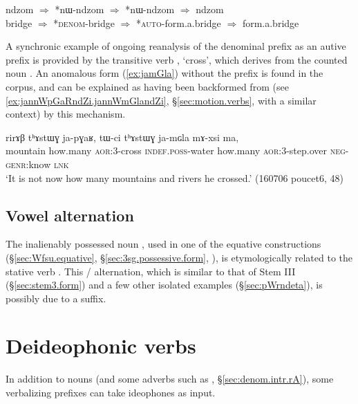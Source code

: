 \begin{exe}
\ex \label{ex:nW.backformation}
\gll   ndzom $\Rightarrow$ *nɯ-ndzom $\Rightarrow$ *nɯ-ndzom $\Rightarrow$ ndzom \\
bridge $\Rightarrow$ *\textsc{denom}-bridge  $\Rightarrow$ *\textsc{auto}-form.a.bridge $\Rightarrow$  form.a.bridge \\
\end{exe}

A synchronic example of ongoing reanalysis of the  denominal prefix as an autive prefix is provided by the transitive verb , `cross', which derives from the counted noun . An anomalous form  (\ref{ex:jamGla}) without the  prefix is found in the corpus, and can be explained as having been backformed from  (see \ref{ex:jannWpGaRndZi.jannWmGlandZi}, §\ref{sec:motion.verbs}, with a similar context) by this mechanism.
 
\begin{exe}
\ex \label{ex:jamGla}
\gll rirɤβ tʰɤstɯɣ ja-pɣaʁ, tɯ-ci tʰɤstɯɣ ja-mɢla mɤ-xsi ma, \\
mountain how.many \textsc{aor}:3\flobv{}-cross \textsc{indef}.\textsc{poss}-water how.many \textsc{aor}:3\flobv{}-step.over \textsc{neg}-\textsc{genr}:know \textsc{lnk} \\
\glt `It is not now how many mountains and rivers he crossed.' (160706 poucet6, 48)
\end{exe}


\subsection{Vowel alternation}  \label{sec:fsu.fse}
The inalienably possessed noun , used in one of the equative constructions (§\ref{sec:Wfsu.equative}, §\ref{sec:3sg.possessive.form}, \citealt{jacques18similative}), is etymologically related to the stative verb . This  /  alternation, which is similar to that of Stem III (§\ref{sec:stem3.form}) and a few other isolated examples (§\ref{sec:pWrndeta}), is possibly due to a  suffix.

 
\section{Deideophonic verbs}  \label{sec:voice.deideophonic}
In addition to nouns (and some adverbs such as  , §\ref{sec:denom.intr.rA}), some verbalizing prefixes can take ideophones as input. 


